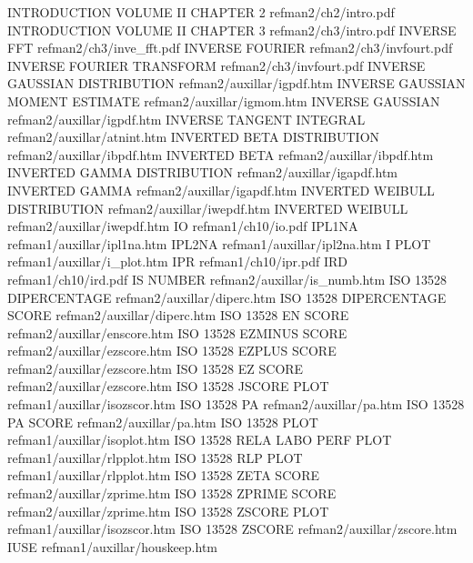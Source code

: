 INTRODUCTION VOLUME II CHAPTER 2        refman2/ch2/intro.pdf
INTRODUCTION VOLUME II CHAPTER 3        refman2/ch3/intro.pdf
INVERSE FFT                             refman2/ch3/inve_fft.pdf
INVERSE FOURIER                         refman2/ch3/invfourt.pdf
INVERSE FOURIER TRANSFORM               refman2/ch3/invfourt.pdf
INVERSE GAUSSIAN DISTRIBUTION           refman2/auxillar/igpdf.htm
INVERSE GAUSSIAN MOMENT ESTIMATE        refman2/auxillar/igmom.htm
INVERSE GAUSSIAN                        refman2/auxillar/igpdf.htm
INVERSE TANGENT INTEGRAL                refman2/auxillar/atnint.htm
INVERTED BETA DISTRIBUTION              refman2/auxillar/ibpdf.htm
INVERTED BETA                           refman2/auxillar/ibpdf.htm
INVERTED GAMMA DISTRIBUTION             refman2/auxillar/igapdf.htm
INVERTED GAMMA                          refman2/auxillar/igapdf.htm
INVERTED WEIBULL DISTRIBUTION           refman2/auxillar/iwepdf.htm
INVERTED WEIBULL                        refman2/auxillar/iwepdf.htm
IO                                      refman1/ch10/io.pdf
IPL1NA                                  refman1/auxillar/ipl1na.htm
IPL2NA                                  refman1/auxillar/ipl2na.htm
I PLOT                                  refman1/auxillar/i_plot.htm
IPR                                     refman1/ch10/ipr.pdf
IRD                                     refman1/ch10/ird.pdf
IS NUMBER                               refman2/auxillar/is_numb.htm
ISO 13528 DIPERCENTAGE                  refman2/auxillar/diperc.htm
ISO 13528 DIPERCENTAGE SCORE            refman2/auxillar/diperc.htm
ISO 13528 EN SCORE                      refman2/auxillar/enscore.htm
ISO 13528 EZMINUS SCORE                 refman2/auxillar/ezscore.htm
ISO 13528 EZPLUS SCORE                  refman2/auxillar/ezscore.htm
ISO 13528 EZ SCORE                      refman2/auxillar/ezscore.htm
ISO 13528 JSCORE PLOT                   refman1/auxillar/isozscor.htm
ISO 13528 PA                            refman2/auxillar/pa.htm
ISO 13528 PA SCORE                      refman2/auxillar/pa.htm
ISO 13528 PLOT                          refman1/auxillar/isoplot.htm
ISO 13528 RELA LABO PERF PLOT           refman1/auxillar/rlpplot.htm
ISO 13528 RLP PLOT                      refman1/auxillar/rlpplot.htm
ISO 13528 ZETA SCORE                    refman2/auxillar/zprime.htm
ISO 13528 ZPRIME SCORE                  refman2/auxillar/zprime.htm
ISO 13528 ZSCORE PLOT                   refman1/auxillar/isozscor.htm
ISO 13528 ZSCORE                        refman2/auxillar/zscore.htm
IUSE                                    refman1/auxillar/houskeep.htm
